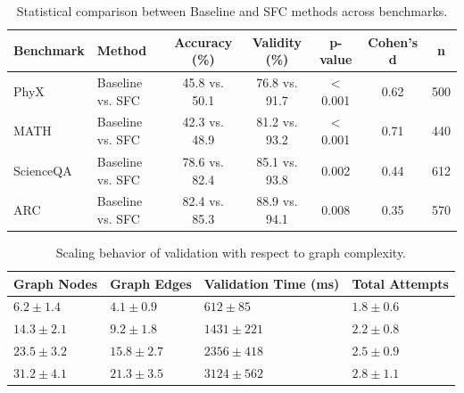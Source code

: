 \documentclass{uai2026} %
\theoremstyle{remark}
\theoremstyle{plain}
\theoremstyle{definition}
\begin{document}
\begin{table}[ht]
\centering


\caption{Statistical comparison between Baseline and SFC methods across benchmarks.}
\label{tab:comparison_stats}
\begin{tabular}{l|l|c|c|c|c|c}
\hline
\textbf{Benchmark} & \textbf{Method} & \textbf{Accuracy (\%)} & \textbf{Validity (\%)} & \textbf{p-value} & \textbf{Cohen's d} & \textbf{n} \\
\hline
PhyX & Baseline vs. SFC & 45.8 vs. 50.1 & 76.8 vs. 91.7 & $<$0.001 & 0.62 & 500 \\
MATH & Baseline vs. SFC & 42.3 vs. 48.9 & 81.2 vs. 93.2 & $<$0.001 & 0.71 & 440 \\
ScienceQA & Baseline vs. SFC & 78.6 vs. 82.4 & 85.1 vs. 93.8 & 0.002 & 0.44 & 612 \\
ARC & Baseline vs. SFC & 82.4 vs. 85.3 & 88.9 vs. 94.1 & 0.008 & 0.35 & 570 \\
\hline
\end{tabular}
\end{table}
\begin{table}[ht]
\centering


\caption{Scaling behavior of validation with respect to graph complexity.}
\label{tab:graph_validation}
\begin{tabular}{l|l|l|l}
\hline
\textbf{Graph Nodes} & \textbf{Graph Edges} & \textbf{Validation Time (ms)} & \textbf{Total Attempts} \\
\hline
$6.2 \pm 1.4$ & $4.1 \pm 0.9$ & $612 \pm 85$ & $1.8 \pm 0.6$ \\
$14.3 \pm 2.1$ & $9.2 \pm 1.8$ & $1431 \pm 221$ & $2.2 \pm 0.8$ \\
$23.5 \pm 3.2$ & $15.8 \pm 2.7$ & $2356 \pm 418$ & $2.5 \pm 0.9$ \\
$31.2 \pm 4.1$ & $21.3 \pm 3.5$ & $3124 \pm 562$ & $2.8 \pm 1.1$ \\
\hline
\end{tabular}
\end{table}
\end{document}
